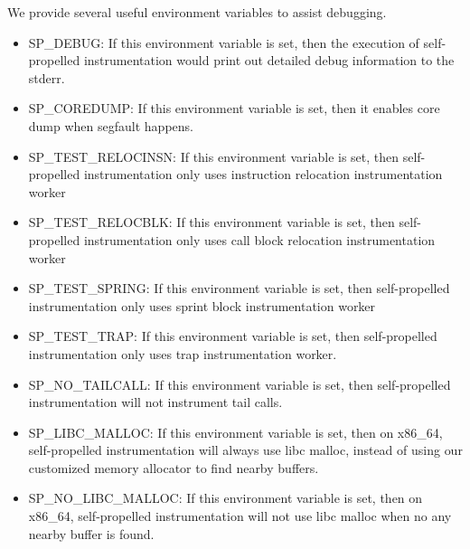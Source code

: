 We provide several useful environment variables to assist debugging.
\begin{itemize}
\item SP\_DEBUG: If this environment variable is set, then the execution of
  self-propelled instrumentation would print out detailed debug information to
  the stderr.
\item SP\_COREDUMP: If this environment variable is set, then it enables core
  dump when segfault happens.
\item SP\_TEST\_RELOCINSN: If this environment variable is set, then self-propelled
  instrumentation only uses instruction relocation instrumentation worker
\item SP\_TEST\_RELOCBLK: If this environment variable is set, then self-propelled
  instrumentation only uses call block relocation instrumentation worker
\item SP\_TEST\_SPRING: If this environment variable is set, then self-propelled
  instrumentation only uses sprint block instrumentation worker
\item SP\_TEST\_TRAP: If this environment variable is set, then self-propelled
  instrumentation only uses trap instrumentation worker.
\item SP\_NO\_TAILCALL: If this environment variable is set, then self-propelled
  instrumentation will not instrument tail calls.
\item SP\_LIBC\_MALLOC: If this environment variable is set, then on x86\_64,
  self-propelled instrumentation will always use libc malloc, instead of using
  our customized memory allocator to find nearby buffers.
\item SP\_NO\_LIBC\_MALLOC: If this environment variable is set, then on
  x86\_64, self-propelled instrumentation will not use libc malloc when no any
  nearby buffer is found.
\end{itemize}
